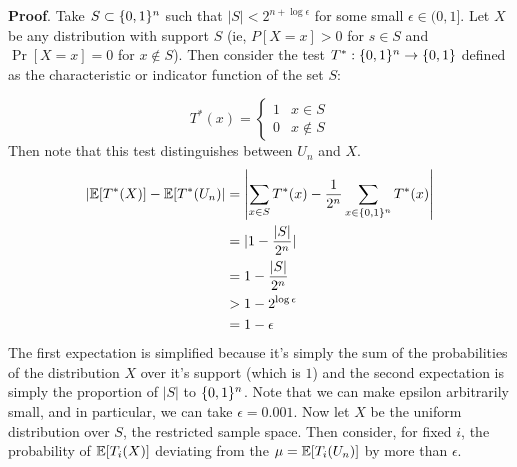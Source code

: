 \documentclass{article}
\begin{document}
\begin{enumerate}[noitemsep,topsep=\mdcompacttopsep]
\begin{itemize}[noitemsep,topsep=\mdcompacttopsep]
\begin{mdbmarginx}{1ex}{0pt}{1ex}{0pt}%
\noindent{}\textbf{Proof}.  Take $S \subset \{0,1\}^n$ such that $|S| < 2^{n + \log \epsilon}$
for some small $\epsilon \in (0,1]$. Let $X$ be any distribution with support $S$ (ie, $P[X = x] > 0$ for $s \in S$
and $\Pr[X = x] = 0$ for $x \notin S$). Then consider the test $T^*: \{0,1\}^n \to \{0,1\}$ defined as the characteristic
or indicator function of the set $S$:%
\end{mdbmarginx}%
\noindent\noindent\[%
T^*(x) = \begin{cases} 
 1 & x \in S \\
 0 & x \notin S 
\end{cases}
\]%
Then note that this test distinguishes between $U_n$ and $X$. 
\noindent\noindent\[%
\begin{aligned}
|\E[ T^*(X)] - \E[T^*(U_n)| &= \left|\sum_{x \in S} T^*(x) - \frac{1}{2^n} \sum_{x\in \zo^n} T^*(x) \right| \\
&= |1 - \frac{|S|}{2^n}| \\
&= 1 - \frac{|S|}{2^n} \\
&> 1 - 2^{\log \epsilon} \\
&= 1 - \epsilon
\end{aligned}
\]%
The first expectation is simplified because it's simply the sum of the probabilities of the distribution
$X$ over it's support (which is $1$) and the second expectation is simply the proportion of $|S|$ to $\{0,1\}^n$.
Note that we can make epsilon arbitrarily small, and in particular, we can take $\epsilon = 0.001$. Now
let $X$ be the uniform distribution over $S$, the restricted sample space. Then consider, for fixed $i$, 
the probability of $\mathbb{E}[T_i(X)]$ deviating from the $\mu = \mathbb{E}[T_i(U_n)]$ by more than $\epsilon$. 
\noindent\noindent\[%
\begin{aligned}

\end{aligned}\]
\end{itemize}
\end{enumerate}
\end{document}
